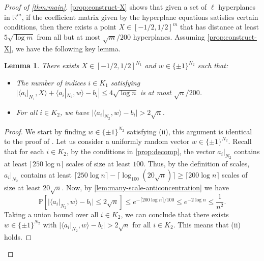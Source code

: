 \documentclass[reqno]{amsart}
\newtheorem{lemma}[theorem]{Lemma}
\theoremstyle{remark}
\theoremstyle{definition}
\numberwithin{theorem}{section}
\renewcommand{\(}{\bigl(}
\renewcommand{\)}{\bigr)\vphantom{)}}
\renewcommand{\le}{\leqslant}
\renewcommand{\ge}{\geqslant}
\renewcommand{\P}{\mathbb{P}}
\newcommand{\R}{\mathbb R}
\newcommand{\ceil}[1]{\lceil#1\rceil}
\newcommand{\ang}[1]{\langle#1\rangle}
\newcommand{\bin}{\{\pm 1\}}
\begin{document}
\begin{proof}[Proof of \cref{thm:main}]
\cref{prop:construct-X} shows that given a set of $\ell$ hyperplanes in $\R^m$, if the coefficient matrix given by the hyperplane equations satisfies certain conditions, then there exists a point $X\in [-1/2, 1/2]^m$ that has distance at least $5\sqrt{\log m}$ from all but at most $\sqrt{m}/200$ hyperplanes. Assuming \cref{prop:construct-X}, we have the following key lemma.

\begin{lemma}\label{lem:key-lemma}
        There exists $X\in [-1/2, 1/2]^{N_1}$ and $w\in \bin^{N_2}$ such that:
    \begin{itemize}
        \item[(i)] The number of indices $i\in K_1$ satisfying $|\ang{a_i|_{N_1},X}+\ang{a_i|_{N_2},w}- b_i| \le 4\sqrt{\log n}$ is at most $\sqrt{n}/200$. \label{item:X-K1} 

        \item[(ii)] For all $i\in K_2$, we have $|\ang{a_i|_{N_2}, w} - b_i| > 2\sqrt{n}$. \label{item:X-K2}

    \end{itemize}
\end{lemma}

\begin{proof}
We start by finding $w\in \bin^{N_2}$ satisfying (ii), this argument is identical to the proof of \cite[Claim~13]{yehuda2021slicing}. Let us consider a uniformly random vector $w\in \bin^{N_2}$. Recall that for each $i\in K_2$, by the conditions in \cref{prop:decomp}, the vector $a_i|_{N_2}$ contains at least $\ceil{250\log n}$ scales of size at least $100$. Thus, by the definition of scales, $a_i|_{N_2}$ contains at least $\ceil{250\log n}-\ceil{\log_{100}(20\sqrt{n})} \ge \ceil{200\log n}$ scales of size at least $20\sqrt{n}$. Now, by \cref{lem:many-scale-anticoncentration} we have 
\[\P[|\ang{a_i|_{N_2}, w} - b_i| \le 2\sqrt{n}] \le e^{-\ceil{200\log n} /100} \le e^{-2\log n} \le \frac{1}{n^2}.\]
Taking a union bound over all $i\in K_2$, we can conclude that there exists $w\in \bin^{N_2}$ with $|\ang{a_i|_{N_2}, w} - b_i| > 2\sqrt{n}$ for all $i\in K_2$. This means that (ii) holds.


\end{proof}
\end{proof}
\end{document}
